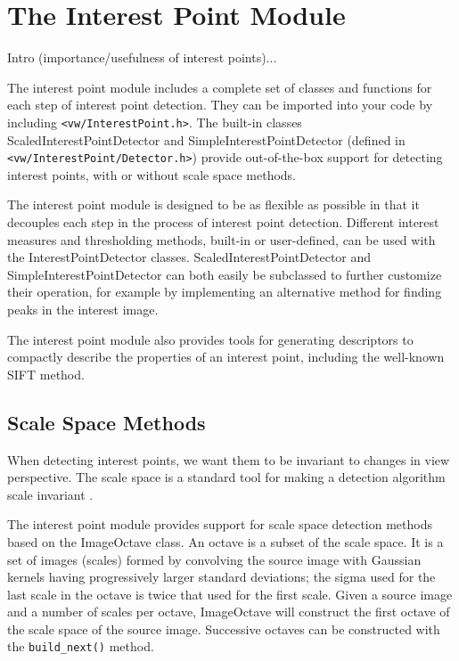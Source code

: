 \chapter{The Interest Point Module}

Intro (importance/usefulness of interest points)...

The interest point module includes a complete set of classes and functions
for each step of interest point detection. They can be imported into
your code by including {\tt <vw/InterestPoint.h>}. The built-in classes
ScaledInterestPointDetector and SimpleInterestPointDetector (defined
in {\tt <vw/InterestPoint/Detector.h>}) provide out-of-the-box
support for detecting interest points, with or without scale space
methods.

The interest point module is designed to be as flexible as possible in that
it decouples each step in the process of interest point detection. Different
interest measures and thresholding methods, built-in or user-defined, can
be used with the InterestPointDetector classes. ScaledInterestPointDetector
and SimpleInterestPointDetector can both easily be subclassed to further
customize their operation, for example by implementing an alternative
method for finding peaks in the interest image.

The interest point module also provides tools for generating descriptors
to compactly describe the properties of an interest point, including
the well-known SIFT method.

\section{Scale Space Methods}
When detecting interest points, we want them to be invariant to changes in
view perspective. The scale space is a standard tool for making a
detection algorithm scale invariant \cite{lindeberg98}.

The interest point module provides support for scale space detection methods
based on the ImageOctave class. An octave is a subset of the scale space.
It is a set of images (scales) formed by convolving the source image
with Gaussian kernels having progressively larger
standard deviations; the sigma used for the last scale in the octave is
twice that used for the first scale. Given a source image and a number of
scales per octave, ImageOctave will construct the first octave of the
scale space of the source image. Successive octaves can be constructed
with the \verb#build_next()# method.

